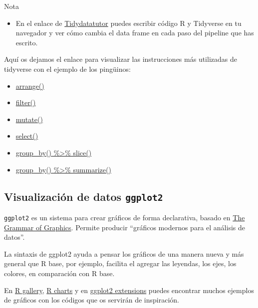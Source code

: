\documentclass[
  letterpaper,
  DIV=11,
  numbers=noendperiod]{scrreprt}
\providecommand{\tightlist}{%
  \setlength{\itemsep}{0pt}\setlength{\parskip}{0pt}}\usepackage{longtable,booktabs,array}
\begin{document}
{Nota}

\begin{itemize}
\tightlist
\item
  En el enlace de \href{https://tidydatatutor.com/}{Tidydatatutor}
  puedes escribir código R y Tidyverse en tu navegador y ver cómo cambia
  el data frame en cada paso del pipeline que has escrito.
\end{itemize}

Aquí os dejamos el enlace para visualizar las instrucciones más
utilizadas de tidyverse con el ejemplo de los pingüinos:

\begin{itemize}
\item
  \href{https://tidydatatutor.com/vis.html\#trace=example-code/r_arrange.json}{arrange()}
\item
  \href{https://tidydatatutor.com/vis.html\#trace=example-code/r_filter.json}{filter()}
\item
  \href{https://tidydatatutor.com/vis.html\#trace=example-code/r_mutate.json}{mutate()}
\item
  \href{https://tidydatatutor.com/vis.html\#trace=example-code/r_select.json}{select()}
\item
  \href{https://tidydatatutor.com/vis.html\#trace=example-code/r_grouped_slice.json}{group\_by()
  \%\textgreater\% slice()}
\item
  \href{https://tidydatatutor.com/vis.html\#trace=example-code/r_grouped_summarise.json}{group\_by()
  \%\textgreater\% summarize()}
\end{itemize}

\subsection{\texorpdfstring{Visualización de datos
\texttt{ggplot2}}{Visualización de datos ggplot2}}\label{visualizaciuxf3n-de-datos-ggplot2}

\texttt{ggplot2} es un sistema para crear gráficos de forma declarativa,
basado en
\href{https://link.springer.com/chapter/10.1007/978-3-642-21551-3_13}{The
Grammar of Graphics}. Permite producir ``gráficos modernos para el
análisis de datos''.

La sintaxis de ggplot2 ayuda a pensar los gráficos de una manera nueva y
más general que R base, por ejemplo, facilita el agregar las leyendas,
los ejes, los colores, en comparación con R base.

En \href{https://r-graph-gallery.com/}{R gallery},
\href{https://r-charts.com}{R charts} y en
\href{https://exts.ggplot2.tidyverse.org/gallery/}{ggplot2 extensions}
puedes encontrar muchos ejemplos de gráficos con los códigos que os
servirán de inspiración.
\end{document}

